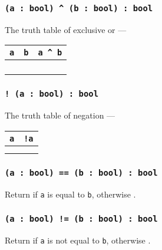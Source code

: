 \subsubsection{\texttt{(a : bool) ^ (b : bool) : bool}}

The truth table of exclusive or —

\begin{table}[H]
	\begin{tabular}{|c|c|c|}
		\hline
		\texttt{a} & \texttt{b} & \texttt{a ^ b} \\ \hline
		\false{} & \false{} & \false{} \\ \hline
		\false{} & \true{}  & \true{}  \\ \hline
		\true{}  & \false{} & \true{}  \\ \hline
		\true{}  & \true{}  & \false{} \\ \hline
	\end{tabular}
\end{table}

\subsubsection{\texttt{! (a : bool) : bool}}

The truth table of negation —

\begin{table}[H]
	\begin{tabular}{|c|c|}
		\hline
		\texttt{a} & \texttt{!a} \\ \hline
		\false{} &  \true{} \\ \hline
		\true{}  & \false{} \\ \hline
	\end{tabular}
\end{table}

\subsubsection{\texttt{(a : bool) == (b : bool) : bool}}

Return \true{} if \texttt{a} is equal to \texttt{b}, otherwise \false{}.

\subsubsection{\texttt{(a : bool) != (b : bool) : bool}}

Return \true{} if \texttt{a} is not equal to \texttt{b}, otherwise \false{}.

